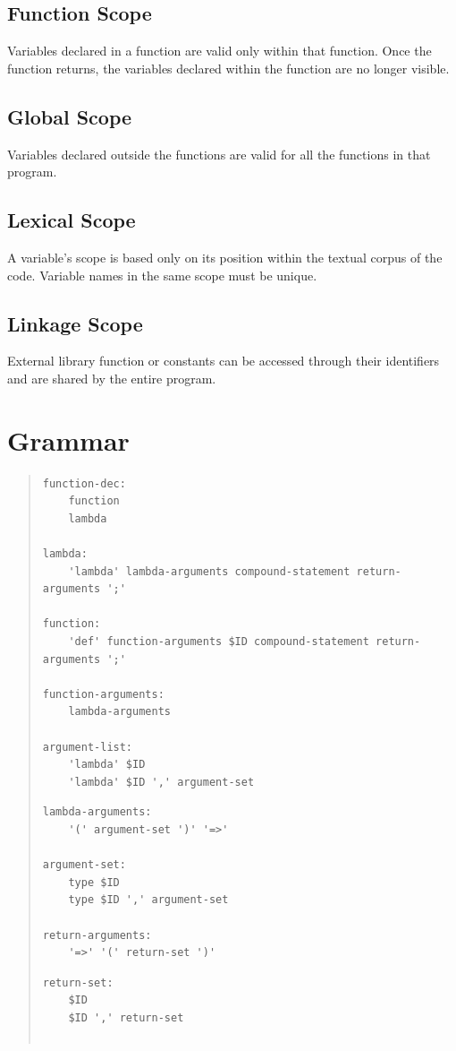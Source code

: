\documentclass[a4paper]{article}
\newcommand{\tab}[1]{\hspace{.2\textwidth}\rlap{#1}}
\begin{document}
\begin{large}
\subsection{Function Scope}
Variables declared in a function are valid only within that function. Once the function returns, the variables declared within the function are no longer visible.

\subsection{Global Scope}
Variables declared outside the functions are valid for all the functions in that program.

\subsection{Lexical Scope}
A variable's scope is based only on its position within the textual corpus of the code. Variable names in the same scope must be unique.

\subsection{Linkage Scope}
External library function or constants can be accessed through their identifiers and are shared by the entire program.

\section{Grammar}
\begin{quote}
\begin{verbatim}
function-dec:
    function
    lambda

lambda:
    'lambda' lambda-arguments compound-statement return-arguments ';'

function:
    'def' function-arguments $ID compound-statement return-arguments ';'

function-arguments:
    lambda-arguments
	
argument-list:
    'lambda' $ID
    'lambda' $ID ',' argument-set

\end{verbatim}
\begin{lstlisting}
lambda-arguments:
    '(' argument-set ')' '=>'

argument-set:	
    type $ID
    type $ID ',' argument-set

return-arguments:
    '=>' '(' return-set ')'
\end{lstlisting} 
    \tab\textepsilon
\begin{lstlisting}
return-set:
    $ID
    $ID ',' return-set


\end{lstlisting}
\end{quote}
\end{large}
\end{document}
